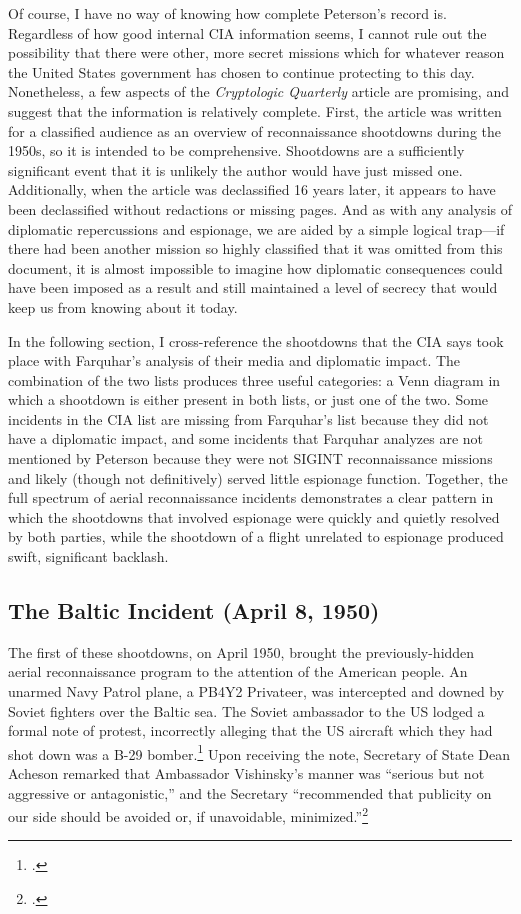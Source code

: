 \documentclass{report}
\begin{document}
\begin{refsegment}
Of course, I have no way of knowing how complete Peterson's record is. Regardless of how good internal CIA information seems, I cannot rule out the possibility that there were other, more secret missions which for whatever reason the United States government has chosen to continue protecting to this day. Nonetheless, a few aspects of the \emph{Cryptologic Quarterly} article are promising, and suggest that the information is relatively complete. First, the article was written for a classified audience as an overview of reconnaissance shootdowns during the 1950s, so it is intended to be comprehensive. Shootdowns are a sufficiently significant event that it is unlikely the author would have just missed one. Additionally, when the article was declassified 16 years later, it appears to have been declassified without redactions or missing pages. And as with any analysis of diplomatic repercussions and espionage, we are aided by a simple logical trap---if there had been another mission so highly classified that it was omitted from this document, it is almost impossible to imagine how diplomatic consequences could have been imposed as a result and still maintained a level of secrecy that would keep us from knowing about it today.

In the following section, I cross-reference the shootdowns that the CIA says took place with Farquhar's analysis of their media and diplomatic impact. The combination of the two lists produces three useful categories: a Venn diagram in which a shootdown is either present in both lists, or just one of the two. Some incidents in the CIA list are missing from Farquhar's list because they did not have a diplomatic impact, and some incidents that Farquhar analyzes are not mentioned by Peterson because they were not SIGINT reconnaissance missions and likely (though not definitively) served little espionage function. Together, the full spectrum of aerial reconnaissance incidents demonstrates a clear pattern in which the shootdowns that involved espionage were quickly and quietly resolved by both parties, while the shootdown of a flight unrelated to espionage produced swift, significant backlash.

\subsection{The Baltic Incident (April 8, 1950)}

The first of these shootdowns, on April 1950, brought the previously-hidden aerial reconnaissance program to the attention of the American people. An unarmed Navy Patrol plane, a PB4Y2 Privateer, was intercepted and downed by Soviet fighters over the Baltic sea. The Soviet ambassador to the US lodged a formal note of protest, incorrectly alleging that the US aircraft which they had shot down was a B-29 bomber.\footcite{kirk_ambassador_1950} Upon receiving the note, Secretary of State Dean Acheson remarked that Ambassador Vishinsky's manner was ``serious but not aggressive or antagonistic,'' and the Secretary ``recommended that publicity on our side should be avoided or, if unavoidable, minimized.''\footcite{kirk_ambassador_1950}


\end{refsegment}
\end{document}
